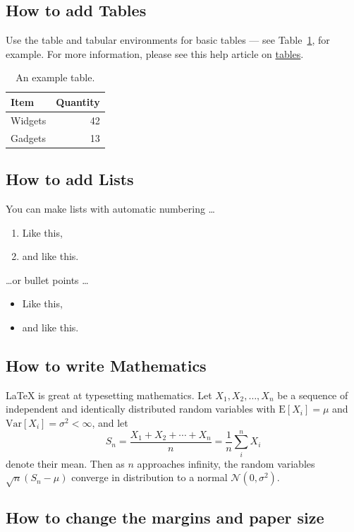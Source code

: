 \documentclass{article}
\begin{document}
\subsection{How to add Tables}

Use the table and tabular environments for basic tables --- see Table~\ref{tab:widgets}, for example. For more information, please see this help article on \href{https://www.overleaf.com/learn/latex/tables}{tables}. 

\begin{table}
\centering
\begin{tabular}{l|r}
Item & Quantity \\\hline
Widgets & 42 \\
Gadgets & 13
\end{tabular}
\caption{\label{tab:widgets}An example table.}
\end{table}

\subsection{How to add Lists}

You can make lists with automatic numbering \dots

\begin{enumerate}
\item Like this,
\item and like this.
\end{enumerate}
\dots or bullet points \dots
\begin{itemize}
\item Like this,
\item and like this.
\end{itemize}

\subsection{How to write Mathematics}

\LaTeX{} is great at typesetting mathematics. Let $X_1, X_2, \ldots, X_n$ be a sequence of independent and identically distributed random variables with $\text{E}[X_i] = \mu$ and $\text{Var}[X_i] = \sigma^2 < \infty$, and let
\[S_n = \frac{X_1 + X_2 + \cdots + X_n}{n}
      = \frac{1}{n}\sum_{i}^{n} X_i\]
denote their mean. Then as $n$ approaches infinity, the random variables $\sqrt{n}(S_n - \mu)$ converge in distribution to a normal $\mathcal{N}(0, \sigma^2)$.


\subsection{How to change the margins and paper size}
\end{document}
